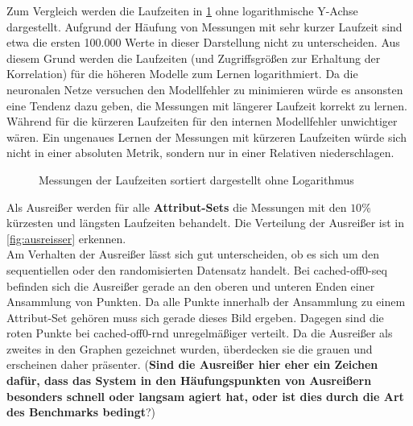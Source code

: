 \documentclass[
	12pt,
	a4paper,
	BCOR10mm,
	DIV14,
	listof=totoc,
	bibliography=totoc,
	headsepline
]{scrreprt}
\begin{document}
Zum Vergleich werden die Laufzeiten in \ref{Laufzeiten_Sortiert_nolog} ohne logarithmische Y-Achse dargestellt. Aufgrund der Häufung von Messungen mit sehr kurzer Laufzeit sind etwa die ersten 100.000 Werte in dieser Darstellung nicht zu unterscheiden. Aus diesem Grund werden die Laufzeiten (und Zugriffsgrößen zur Erhaltung der Korrelation) für die höheren Modelle zum Lernen logarithmiert. Da die neuronalen Netze versuchen den Modellfehler zu minimieren würde es ansonsten eine Tendenz dazu geben, die Messungen mit längerer Laufzeit korrekt zu lernen. Während für die kürzeren Laufzeiten für den internen Modellfehler unwichtiger wären. Ein ungenaues Lernen der Messungen mit kürzeren Laufzeiten würde sich  nicht in einer absoluten Metrik, sondern nur in einer Relativen niederschlagen.

\begin{figure}
	\hfill
	\caption{Messungen der Laufzeiten sortiert dargestellt ohne Logarithmus}
	\label{Laufzeiten_Sortiert_nolog}
\end{figure} 

Als Ausreißer werden für alle \textbf{Attribut-Sets} die Messungen mit den $10\%$ kürzesten und längsten Laufzeiten behandelt. Die Verteilung der Ausreißer ist in \ref{fig:ausreisser} erkennen.\\
Am Verhalten der Ausreißer lässt sich gut unterscheiden, ob es sich um den sequentiellen oder den randomisierten Datensatz handelt. Bei cached-off0-seq befinden sich die Ausreißer gerade an den oberen und unteren Enden einer Ansammlung von Punkten. Da alle Punkte innerhalb der Ansammlung zu einem Attribut-Set gehören muss sich gerade dieses Bild ergeben. Dagegen sind die roten Punkte bei cached-off0-rnd unregelmäßiger verteilt. Da die Ausreißer als zweites in den Graphen gezeichnet wurden, überdecken sie die grauen und erscheinen daher präsenter. (\textbf{Sind die Ausreißer hier eher ein Zeichen dafür, dass das System in den Häufungspunkten von Ausreißern besonders schnell oder langsam  agiert hat, oder ist dies durch die Art des Benchmarks bedingt}?)
\end{document}
